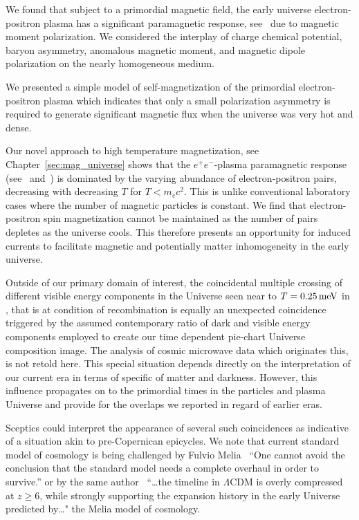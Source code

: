 We found that subject to a primordial magnetic field, the early universe electron-positron plasma has a significant paramagnetic response, see~ due to magnetic moment polarization. We considered the interplay of charge chemical potential, baryon asymmetry, anomalous magnetic moment, and magnetic dipole polarization on the nearly homogeneous medium.

We presented a simple model of self-magnetization of the primordial electron-positron plasma which indicates that only a small polarization asymmetry is required to generate significant magnetic flux when the universe was very hot and dense.

Our novel approach to high temperature magnetization, see Chapter~\ref{sec:mag_universe} shows that the $e^{+}e^{-}$-plasma paramagnetic response (see~ and~) is dominated by the varying abundance of electron-positron pairs, decreasing with decreasing $T$ for $T\!<\!m_{e}c^2$. This is unlike conventional laboratory cases where the number of magnetic particles is constant. We find that electron-positron spin magnetization cannot be maintained as the number of pairs depletes as the universe cools. This therefore presents an opportunity for induced currents to facilitate magnetic and potentially matter inhomogeneity in the early universe. 
 
Outside of our primary domain of interest, the coincidental multiple crossing of different visible energy components in the Universe seen near to $T=0.25\text{\,meV}$ in , that is at condition of recombination is equally an unexpected coincidence triggered by the assumed contemporary ratio of dark and visible energy components employed to create our time dependent pie-chart Universe composition image. The analysis of cosmic microwave data which originates this, is not retold here. This special situation depends directly on the interpretation of our current era in terms of specific of matter and darkness. However, this influence propagates on to the primordial times in the particles and plasma Universe and provide for the overlaps we reported in regard of earlier eras.

Sceptics could interpret the appearance of several such coincidences as indicative of a situation akin to pre-Copernican epicycles. We note that current standard model of cosmology is being challenged by Fulvio Melia~\cite{Melia:2022itm} ``One cannot avoid the conclusion that the standard model needs a complete overhaul in order to survive.'' or by the same author~\cite{Melia:2024rzy} ``\ldots the timeline in $\Lambda$CDM is overly compressed at $z\ge 6$, while strongly supporting the expansion history in the early Universe predicted by\ldots" the Melia model of cosmology. 

